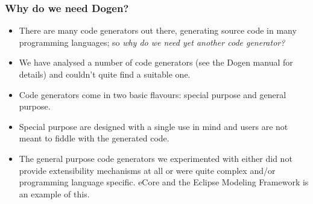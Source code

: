 \documentclass{beamer}
\begin{document}
\begin{frame}
\frametitle{Why do we need Dogen?}

\begin{itemize}

\item There are many code generators out there, generating source code
  in many programming languages; so \emph{why do we need yet another
    code generator?}

\pause

\item We have analysed a number of code generators (see the Dogen
  manual for details) and couldn't quite find a suitable one.

\pause

\item Code generators come in two basic flavours: special purpose and
  general purpose.

\pause

\item Special purpose are designed with a single use in mind and users
  are not meant to fiddle with the generated code.

\pause

\item The general purpose code generators we experimented with either
  did not provide extensibility mechanisms at all or were quite
  complex and/or programming language specific. eCore and the Eclipse
  Modeling Framework is an example of this.

\end{itemize}

\end{frame}
\end{document}
